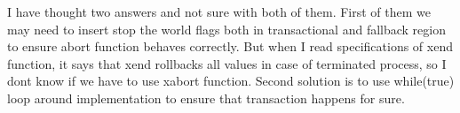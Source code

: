 \documentclass[11pt]{article}
\newenvironment{answer}{\begin{minipage}[c][1.5in]{\textwidth}}{\end{minipage}}
\begin{document}
\begin{answer}
I have thought two answers and not sure with both of them. \newline
First of them we may need to insert stop the world flags both in transactional and fallback region to ensure 
abort function behaves correctly. But when I read specifications of xend function, it says that xend rollbacks all 
values in case of terminated process, so I dont know if we have to use xabort function. \newline
Second solution is to use while(true) loop around implementation to ensure that transaction happens for sure.
\end{answer}
\end{document}
